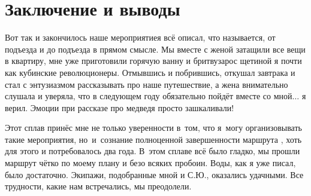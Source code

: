 \chapter{Заключение и выводы} 

Вот так и закончилось наше мероприятие\mdash я всё описал, что называется, от подъезда и до подъезда в прямом смысле. Мы вместе с женой затащили все вещи в квартиру, мне уже приготовили горячую ванну и бритву\mdash зарос щетиной я почти как кубинские революционеры. Отмывшись и побрившись, откушал завтрака и стал с энтузиазмом рассказывать про наше путешествие, а жена внимательно слушала и уверяла, что в следующем году обязательно пойдёт вместе со мной$\ldots$ я верил. Эмоции при рассказе про медведя просто зашкаливали!

Этот сплав принёс мне не только уверенности в~том, что я~могу организовывать такие мероприятия, но~и~сознание полноценной завершенности маршрута , хоть для этого и потребовалось два года. В~этом сплаве всё было гладко, мы прошли маршрут чётко по моему плану и безо всяких пробоин. Воды, как я уже писал, было достаточно. Экипажи, подобранные мной и С.Ю., оказались удачными. Все трудности, какие нам встречались, мы преодолели.

